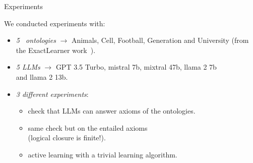 \documentclass[presentation]{beamer}\mode<presentation>{\usetheme{blackAMSBolognaFC}}
\begin{document}
\begin{frame}[c]{Experiments}


    We conducted experiments with:
    \vfill
    \begin{itemize}
        \item \emph{5 \EL~ontologies} $\rightarrow$ Animals, Cell, Football, Generation and University (from the ExactLearner work~).
        \vfill
        \item \emph{5 LLMs} $\rightarrow$ GPT 3.5 Turbo, mistral 7b, mixtral 47b, llama 2 7b
        \\
        and llama 2 13b.
        \vfill
        \item \emph{3 different experiments}:
        \begin{itemize}
            \item \quad check that LLMs can answer axioms of the ontologies.
            \item \quad same check but on the entailed axioms
            \\\quad (logical closure is finite!).
            \item \quad active learning with a trivial learning algorithm.
        \end{itemize}
        \vfill
    \end{itemize}

\end{frame}
\end{document}
